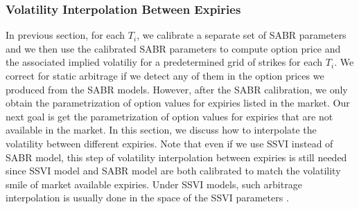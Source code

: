 \documentclass[letterpaper,12pt,titlepage,oneside,final]{book}
\numberwithin{equation}{section}
\theoremstyle{definition}
\begin{document}
 
 
 
 




 





\subsubsection{Volatility Interpolation Between Expiries}
In previous section, for each $T_i$, we calibrate a separate set of SABR parameters and we then use the calibrated SABR parameters to compute option price and the associated implied volatiliy for a predetermined grid of strikes for each $T_i$. We correct for static arbitrage if we detect any of them in the option prices we produced from the SABR models. However, after the SABR calibration, we only obtain the parametrization of  option values for expiries listed in the market. Our next goal is get  the parametrization of option values for expiries that are not available in the market. In this section, we discuss how to interpolate the volatility between different expiries. Note that even if we use SSVI instead of SABR model, this step of volatility interpolation between expiries is still needed since SSVI model and SABR model are both calibrated to match the volatility smile of market available expiries. Under SSVI models, such arbitrage interpolation is usually done in the space of the SSVI parameters \cite{corbetta2019robust}.
\end{document}
